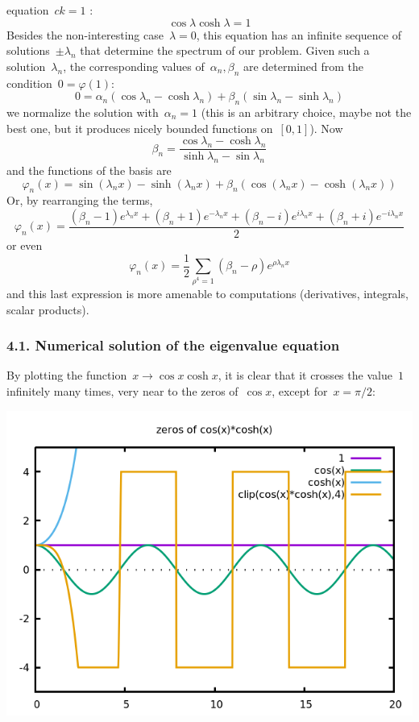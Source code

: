 equation~$ck=1$ :
$$
\cos\lambda\cosh\lambda=1
$$
Besides the non-interesting case~$\lambda=0$, this equation has an infinite
sequence of solutions~$\pm\lambda_n$ that determine the spectrum of our
problem.  Given such a solution~$\lambda_n$, the corresponding values
of~$\alpha_n,\beta_n$ are determined from the condition~$0=\varphi(1)$:
$$
0 =
\alpha_n(\cos\lambda_n-\cosh\lambda_n)
+\beta_n(\sin\lambda_n-\sinh\lambda_n)
$$
we normalize the solution with~$\alpha_n=1$ (this is an arbitrary choice,
maybe not the best one, but it produces nicely bounded functions on~$[0,1]$).  Now
$$
\beta_n=\frac{\cos\lambda_n-\cosh\lambda_n}{\sinh\lambda_n-\sin\lambda_n}
$$
and the functions of the basis are
$$
\varphi_n(x)=\sin(\lambda_nx)-\sinh(\lambda_nx)+\beta_n(\cos(\lambda_nx)-\cosh(\lambda_nx))
$$
Or, by rearranging the terms,
$$
\varphi_n(x)=
\frac{
 (\beta_n-1) e^{\lambda_nx}
+(\beta_n+1) e^{-\lambda_nx}
+(\beta_n-i) e^{i\lambda_nx}
+(\beta_n+i) e^{-i\lambda_nx}
}{2}
$$
or even
$$
\varphi_n(x)=\frac{1}{2}\sum_{\rho^4=1}
(\beta_n-\rho)e^{\rho\lambda_n x}
$$
and this last expression is more amenable to computations (derivatives,
integrals, scalar products).

\subsubsection{4.1. Numerical solution of the eigenvalue equation}

By plotting the function~$x\to\cos x\cosh x$, it is clear that it crosses the
value~$1$ infinitely many times, very near to the zeros of~$\cos x$, except
for~$x=\pi/2$:

\includegraphics{coscosh.png}


